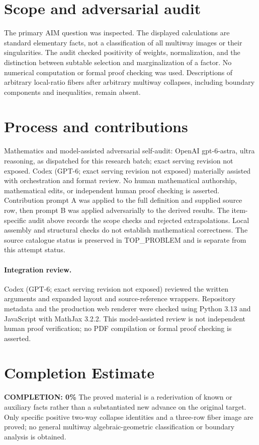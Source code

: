 \documentclass[11pt]{article}
\begin{document}
\section{Scope and adversarial audit}
The primary AIM question was inspected. The displayed calculations are
standard elementary facts, not a classification of all multiway images or
their singularities. The audit checked positivity of weights, normalization,
and the distinction between subtable selection and marginalization of a
factor. No numerical computation or formal proof checking was used.
Descriptions of arbitrary local-ratio fibers after arbitrary multiway
collapses, including boundary components and inequalities, remain absent.

\section{Process and contributions}
Mathematics and model-assisted adversarial self-audit: OpenAI gpt-6-astra, ultra reasoning, as dispatched for this research batch; exact serving revision not exposed. Codex (GPT-6; exact serving revision not exposed) materially assisted with orchestration and format review. No human mathematical authorship, mathematical edits, or independent human proof checking is asserted.
Contribution prompt A was applied to the full definition and supplied source row, then prompt B was applied adversarially to the derived results. The item-specific audit above records the scope checks and rejected extrapolations. Local assembly and structural checks do not establish mathematical correctness. The source catalogue status is preserved in TOP\_PROBLEM and is separate from this attempt status.
\paragraph{Integration review.} Codex (GPT-6; exact serving revision not exposed) reviewed the written arguments and expanded layout and source-reference wrappers. Repository metadata and the production web renderer were checked using Python 3.13 and JavaScript with MathJax 3.2.2. This model-assisted review is not independent human proof verification; no PDF compilation or formal proof checking is asserted.

\section{Completion Estimate}
\noindent\textbf{COMPLETION: 0\%}
The proved material is a rederivation of known or auxiliary facts rather than a substantiated new advance on the original target. Only specific positive two-way collapse identities and a three-row fiber image are proved; no general multiway algebraic-geometric classification or boundary analysis is obtained.
\end{document}

